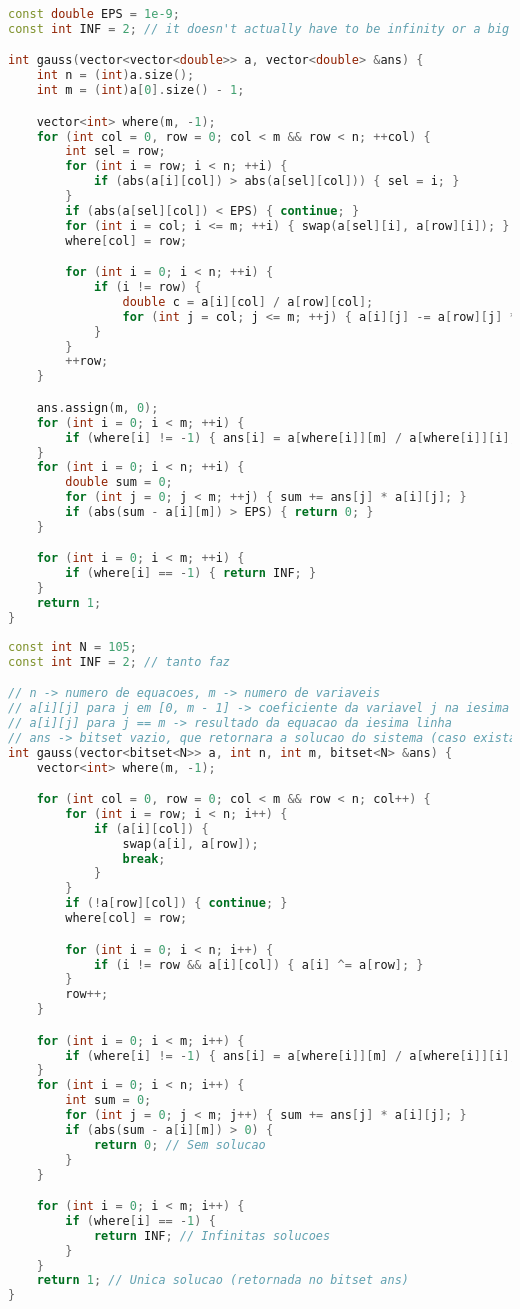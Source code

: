 \documentclass[11pt, a4paper, twoside]{book}
\begin{document}
\begin{lstlisting}[language=C++]
const double EPS = 1e-9;
const int INF = 2; // it doesn't actually have to be infinity or a big number

int gauss(vector<vector<double>> a, vector<double> &ans) {
    int n = (int)a.size();
    int m = (int)a[0].size() - 1;

    vector<int> where(m, -1);
    for (int col = 0, row = 0; col < m && row < n; ++col) {
        int sel = row;
        for (int i = row; i < n; ++i) {
            if (abs(a[i][col]) > abs(a[sel][col])) { sel = i; }
        }
        if (abs(a[sel][col]) < EPS) { continue; }
        for (int i = col; i <= m; ++i) { swap(a[sel][i], a[row][i]); }
        where[col] = row;

        for (int i = 0; i < n; ++i) {
            if (i != row) {
                double c = a[i][col] / a[row][col];
                for (int j = col; j <= m; ++j) { a[i][j] -= a[row][j] * c; }
            }
        }
        ++row;
    }

    ans.assign(m, 0);
    for (int i = 0; i < m; ++i) {
        if (where[i] != -1) { ans[i] = a[where[i]][m] / a[where[i]][i]; }
    }
    for (int i = 0; i < n; ++i) {
        double sum = 0;
        for (int j = 0; j < m; ++j) { sum += ans[j] * a[i][j]; }
        if (abs(sum - a[i][m]) > EPS) { return 0; }
    }

    for (int i = 0; i < m; ++i) {
        if (where[i] == -1) { return INF; }
    }
    return 1;
}
\end{lstlisting}

\hfill

\begin{lstlisting}[language=C++]
const int N = 105;
const int INF = 2; // tanto faz

// n -> numero de equacoes, m -> numero de variaveis
// a[i][j] para j em [0, m - 1] -> coeficiente da variavel j na iesima equacao
// a[i][j] para j == m -> resultado da equacao da iesima linha
// ans -> bitset vazio, que retornara a solucao do sistema (caso exista)
int gauss(vector<bitset<N>> a, int n, int m, bitset<N> &ans) {
    vector<int> where(m, -1);

    for (int col = 0, row = 0; col < m && row < n; col++) {
        for (int i = row; i < n; i++) {
            if (a[i][col]) {
                swap(a[i], a[row]);
                break;
            }
        }
        if (!a[row][col]) { continue; }
        where[col] = row;

        for (int i = 0; i < n; i++) {
            if (i != row && a[i][col]) { a[i] ^= a[row]; }
        }
        row++;
    }

    for (int i = 0; i < m; i++) {
        if (where[i] != -1) { ans[i] = a[where[i]][m] / a[where[i]][i]; }
    }
    for (int i = 0; i < n; i++) {
        int sum = 0;
        for (int j = 0; j < m; j++) { sum += ans[j] * a[i][j]; }
        if (abs(sum - a[i][m]) > 0) {
            return 0; // Sem solucao
        }
    }

    for (int i = 0; i < m; i++) {
        if (where[i] == -1) {
            return INF; // Infinitas solucoes
        }
    }
    return 1; // Unica solucao (retornada no bitset ans)
}
\end{lstlisting}
\end{document}
